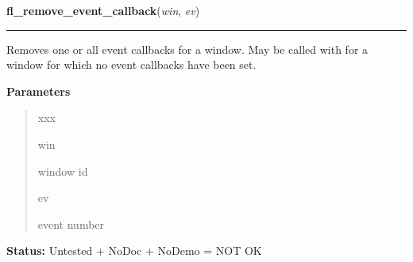     \label{xformslib:library:fl_remove_event_callback}

    \vspace{0.5ex}

\hspace{.8\funcindent}\begin{boxedminipage}{\funcwidth}

    \raggedright \textbf{fl\_remove\_event\_callback}(\textit{win}, \textit{ev})

    \vspace{-1.5ex}

    \rule{\textwidth}{0.5\fboxrule}
\setlength{\parskip}{2ex}
    Removes one or all event callbacks for a window. May be called with for
    a window for which no event callbacks have been set.

\setlength{\parskip}{1ex}
      \textbf{Parameters}
      \vspace{-1ex}

      \begin{quote}
        \begin{Ventry}{xxx}

          \item[win]

          window id

          \item[ev]

          event number

        \end{Ventry}

      \end{quote}

\textbf{Status:} Untested + NoDoc + NoDemo = NOT OK



    \end{boxedminipage}

    \label{xformslib:library:fl_activate_event_callbacks}

    \vspace{0.5ex}

